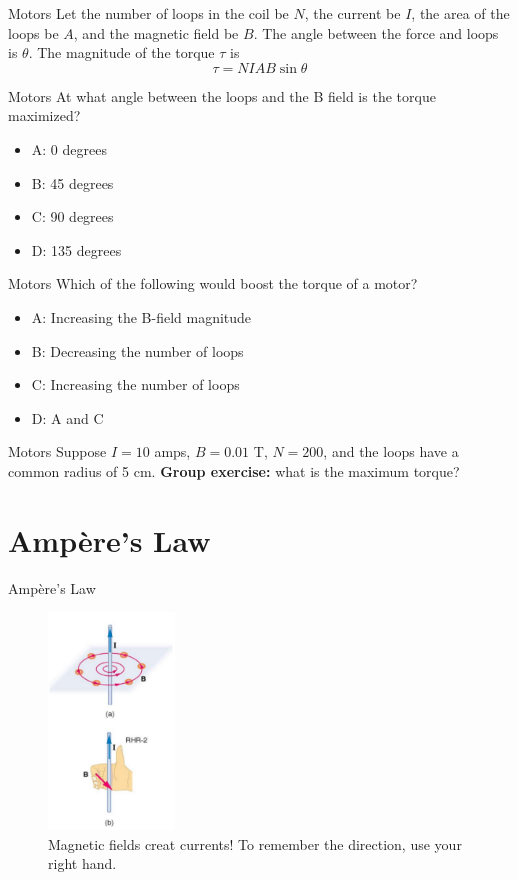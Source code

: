\documentclass{beamer}
\begin{document}
\begin{frame}{Motors}
Let the number of loops in the coil be $N$, the current be $I$, the area of the loops be $A$, and the magnetic field be $B$.  The angle between the force and loops is $\theta$.  The magnitude of the torque $\tau$ is
\begin{equation}
\tau = N I A B \sin\theta
\end{equation}
\end{frame}

\begin{frame}{Motors}
At what angle between the loops and the B field is the torque maximized?
\begin{itemize}
\item A: 0 degrees
\item B: 45 degrees
\item C: 90 degrees
\item D: 135 degrees
\end{itemize}
\end{frame}

\begin{frame}{Motors}
Which of the following would boost the torque of a motor?
\begin{itemize}
\item A: Increasing the B-field magnitude
\item B: Decreasing the number of loops
\item C: Increasing the number of loops
\item D: A and C
\end{itemize}
\end{frame}

\begin{frame}{Motors}
Suppose $I = 10$ amps, $B = 0.01$ T, $N = 200$, and the loops have a common radius of 5 cm.  \textbf{Group exercise:} what is the maximum torque?
\end{frame}

\section{Amp\`{e}re's Law}

\begin{frame}{Amp\`{e}re's Law}
\begin{figure}
\centering
\includegraphics[width=0.3\textwidth]{figures/rhr2.png}
\caption{\label{fig:amp} Magnetic fields creat currents!  To remember the direction, use your right hand.}
\end{figure}
\end{frame}
\end{document}
